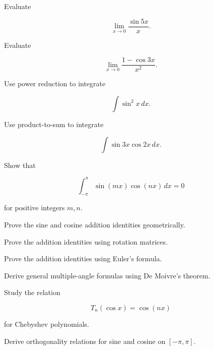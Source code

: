 \begin{exercise}[3]
Evaluate

\[
\lim_{x\to0}
\frac{\sin5x}{x}.
\]
\end{exercise}

\begin{exercise}[3]
Evaluate

\[
\lim_{x\to0}
\frac{1-\cos3x}{x^2}.
\]
\end{exercise}

\begin{exercise}[3]
Use power reduction to integrate

\[
\int\sin^2x\,dx.
\]
\end{exercise}

\begin{exercise}[3]
Use product-to-sum to integrate

\[
\int\sin3x\cos2x\,dx.
\]
\end{exercise}

\begin{exercise}[3]
Show that

\[
\int_{-\pi}^{\pi}
\sin(mx)\cos(nx)\,dx=0
\]

for positive integers \(m,n\).
\end{exercise}

\begin{exercise}[4]
Prove the sine and cosine addition identities geometrically.
\end{exercise}

\begin{exercise}[4]
Prove the addition identities using rotation matrices.
\end{exercise}

\begin{exercise}[4]
Prove the addition identities using Euler's formula.
\end{exercise}

\begin{exercise}[4]
Derive general multiple-angle formulas using De Moivre's theorem.
\end{exercise}

\begin{exercise}[4]
Study the relation

\[
T_n(\cos x)=\cos(nx)
\]

for Chebyshev polynomials.
\end{exercise}

\begin{exercise}[4]
Derive orthogonality relations for sine and cosine on \([-\pi,\pi]\).
\end{exercise}

